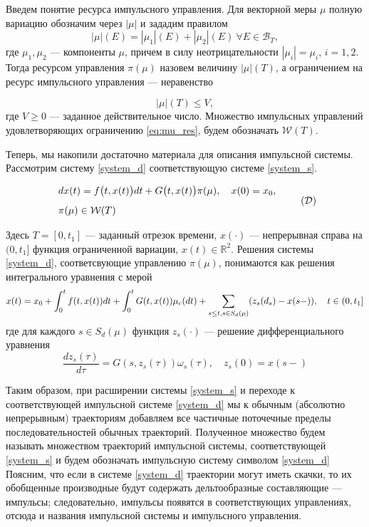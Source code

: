 \documentclass[a4paper,12pt]{article}
\begin{document}
Введем понятие ресурса импульсного управления. Для векторной меры
$\mu$ полную вариацию обозначим через $|\mu|$ и зададим правилом
\begin{equation*}
    |\mu|(E) = |\mu_1|(E) + |\mu_2|(E) \ \forall E \in \mathcal{B}_T,
\end{equation*}
где $\mu_1,\mu_2$ --- компоненты $\mu$, причем в силу
неотрицательности $|\mu_i| = \mu_i$, $i=1,2$. Тогда ресурсом
управления $\pi(\mu)$ назовем величину $|\mu|(T)$, а ограничением на
ресурс импульсного управления --- неравенство

\begin{equation}
    \label{eq:mu_res}
    |\mu|(T) \le V,
\end{equation}
где $V \ge 0$ --- заданное действительное число. Множество импульсных
управлений удовлетворяющих ограничению \eqref{eq:mu_res}, будем
обозначать $\mathcal{W}(T)$.


Теперь, мы накопили достаточно материала для описания импульсной
системы. Рассмотрим систему \eqref{system_d} соответствующую системе
\eqref{system_s}.

\begin{equation}
    \label{system_d}
    \begin{array}{l}
        dx(t)=f\big(t,x(t)\big)dt+G\big(t,x(t)\big)\pi(\mu), \quad
        x(0)=x_0, \\[8pt]
        \pi(\mu) \in \mathcal{W}(T)
    \end{array} \tag{$\mathcal{D}$}
\end{equation}

Здесь $T=[0,t_1]$ --- заданный отрезок времени, $x(\cdot)$ ---
непрерывная справа на $(0,t_1]$ функция ограниченной вариации, $x(t)
\in \mathbb{R}^2$. Решения системы \eqref{system_d}, соответсвующие
управлению $\pi(\mu)$, понимаются как решения интегрального уравнения
с мерой
\begin{equation*}
    x(t) = x_0 + \int_0^t f(t,x(t))dt + \int_0^t G(t,x(t)) \mu_c(dt) +
    \sum_{s \le t,\\s \in S_d(\mu)} (z_s(d_s) - x(s-)), \quad t \in (0,t_1]
\end{equation*}
где для каждого $s \in S_d(\mu)$ функция $z_s(\cdot)$ --- решение
дифференциального уравнения
\begin{equation*}
    \frac{dz_s(\tau)}{d\tau} = G(s,z_s(\tau))\omega_s(\tau), \quad z_s(0)=x(s-)
\end{equation*}

Таким образом, при расширении системы \eqref{system_s} и переходе к
соответствующей импульсной системе \eqref{system_d} мы к обычным
(абсолютно непрерывным) траекториям добавляем все частичные
поточечные пределы последовательностей обычных
траекторий. Полученное множество будем называть множеством
траекторий импульсной системы, соответствующей \eqref{system_s} и будем
обозначать импульсную систему символом \eqref{system_d} Поясним,
что если в системе \eqref{system_d} траектории могут иметь скачки,
то их обобщенные производные будут содержать дельтообразные
составляющие --- импульсы; следовательно, импульсы появятся в
соответствующих управлениях, отсюда и названия импульсной системы и
импульсного управления.
\end{document}

